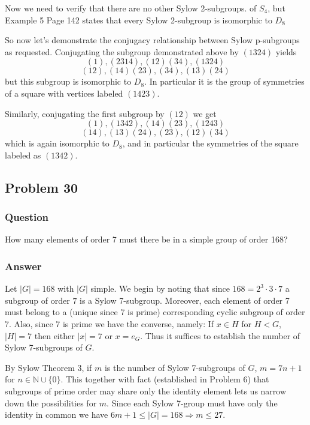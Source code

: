 \documentclass[12pt]{article}
\begin{document}
Now we need to verify that there are no other Sylow 2-subgroups. of $S_4$, but Example 5 Page 142 states that every Sylow 2-subgroup is isomorphic to $D_8$

So now let's demonstrate the conjugacy relationship between Sylow p-subgroups as requested. Conjugating the subgroup demonstrated above by $(1 3 2 4)$ yields
\[(1), (2 3 1 4), (1 2)(3 4), (1 3 2 4)\]
\[(1 2), (1 4)(2 3), (3 4), (1 3) (2 4)\]
but this subgroup is isomorphic to $D_8$. In particular it is the group of symmetries of a square with vertices labeled $(1 4 2 3)$.

Similarly, conjugating the first subgroup by $(1 2)$ we get
\[(1), (1 3 4 2), (1 4)(2 3), (1 2 4 3)\]
\[(1 4), (1 3)(2 4), (2 3), (1 2)(3 4)\]
which is again isomorphic to $D_8$, and in particular the symmetries of the square labeled as $(1 3 4 2)$.

\subsection{Problem 30}

\subsubsection{Question}

How many elements of order 7 must there be in a simple group of order 168?


\subsubsection{Answer}

Let $|G|=168$ with $|G|$ simple. We begin by noting that since $168=2^3 \cdot 3 \cdot 7$ a subgroup of order  $7$ is a Sylow 7-subgroup. Moreover, each element of order 7 must belong to a (unique since 7 is prime) corresponding cyclic subgroup of order 7. Also, since 7 is prime we have the converse, namely: If $x\in H$ for $H<G$, $|H|=7$ then either $|x|=7$ or $x=e_G$. Thus it suffices to establish the number of Sylow 7-subgroups of $G$.

By Sylow Theorem 3, if $m$ is the number of Sylow 7-subgroups of $G$, $m=7n+1$ for $n\in \mathbb{N} \cup \{0\}$. This together with fact (established in Problem 6) that subgroups of prime order may share only the identity element lets us narrow down the possibilities for $m$. Since each Sylow 7-group must have only the identity in common we have $6m+1\leq |G|= 168 \Rightarrow m \leq 27$.
\end{document}
